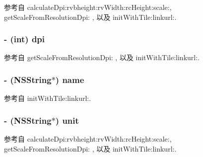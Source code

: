 参考自 calculate\-Dpi\-:rvbheight\-:rv\-Width\-:rc\-Height\-:scale\-:, get\-Scale\-From\-Resolution\-Dpi\-: , 以及 init\-With\-Tile\-:linkurl\-:.

\hypertarget{interface_r_m_s_m_layer_info_a4f0a8078ba4d84c1eab544e0667d0872}{
\subsubsection[{dpi}]{\setlength{\rightskip}{0pt plus 5cm}-\/ (int) dpi\hspace{0.3cm}{\ttfamily [protected]}}}\label{interface_r_m_s_m_layer_info_a4f0a8078ba4d84c1eab544e0667d0872}


参考自 get\-Scale\-From\-Resolution\-Dpi\-: , 以及 init\-With\-Tile\-:linkurl\-:.

\hypertarget{interface_r_m_s_m_layer_info_a440f798ca882b5d5772018e3ef0558bf}{
\subsubsection[{name}]{\setlength{\rightskip}{0pt plus 5cm}-\/ (N\-S\-String$\ast$) name\hspace{0.3cm}{\ttfamily [protected]}}}\label{interface_r_m_s_m_layer_info_a440f798ca882b5d5772018e3ef0558bf}


参考自 init\-With\-Tile\-:linkurl\-:.

\hypertarget{interface_r_m_s_m_layer_info_a7406807133af7ad0ce73440c382413f4}{
\subsubsection[{unit}]{\setlength{\rightskip}{0pt plus 5cm}-\/ (N\-S\-String$\ast$) unit\hspace{0.3cm}{\ttfamily [protected]}}}\label{interface_r_m_s_m_layer_info_a7406807133af7ad0ce73440c382413f4}


参考自 calculate\-Dpi\-:rvbheight\-:rv\-Width\-:rc\-Height\-:scale\-:, get\-Scale\-From\-Resolution\-Dpi\-: , 以及 init\-With\-Tile\-:linkurl\-:.



